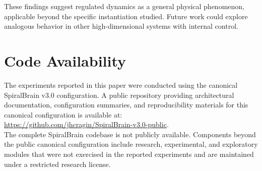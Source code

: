 \documentclass[12pt,a4paper]{article}
\begin{document}
These findings suggest regulated dynamics as a general physical phenomenon, applicable beyond the specific instantiation studied. Future work could explore analogous behavior in other high-dimensional systems with internal control.

\section{Code Availability}

The experiments reported in this paper were conducted using the canonical SpiralBrain v3.0 configuration.
A public repository providing architectural documentation, configuration summaries, and reproducibility materials for this canonical configuration is available at: \\
\url{https://github.com/jhcragin/SpiralBrain-v3.0-public}. \\

The complete SpiralBrain codebase is not publicly available. Components beyond the public canonical configuration include research, experimental, and exploratory modules that were not exercised in the reported experiments and are maintained under a restricted research license.



\end{document}
